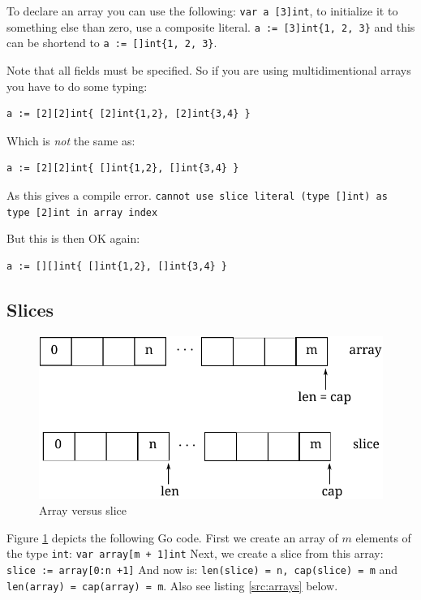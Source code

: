 To declare an array you can use the following: \lstinline{var a [3]int},
to initialize it to something else than zero, use a composite literal.
\lstinline|a := [3]int{1, 2, 3}| and
this can be shortend to \lstinline|a := []int{1, 2, 3}|.

Note that all fields must be specified.  So if you are using multidimentional
arrays you have to do some typing:
\begin{lstlisting}
a := [2][2]int{ [2]int{1,2}, [2]int{3,4} }
\end{lstlisting}
Which is \emph{not} the same as:
\begin{lstlisting}
a := [2][2]int{ []int{1,2}, []int{3,4} }
\end{lstlisting}
As this gives a compile error.\newline
\lstinline{cannot use slice literal (type []int) as type [2]int in array index}

But this is then OK again:
\begin{lstlisting}
a := [][]int{ []int{1,2}, []int{3,4} }
\end{lstlisting}

\subsection{Slices}

\begin{figure}[!bh]
\caption{Array versus slice}
\label{fig:array-vs-slice}
\begin{center}
\includegraphics[scale=0.65]{fig/array-vs-slice.pdf}
\end{center}
\end{figure}
Figure \ref{fig:array-vs-slice} depicts the following Go code.
First we create an array of $m$ elements of the type \lstinline{int}:
\lstinline{var array[m + 1]int}\newline
Next, we create a slice from this array: 
\lstinline{slice := array[0:n +1]}\newline
And now is: \lstinline{len(slice) = n, cap(slice) = m} and
\lstinline{len(array) = cap(array) = m}.\newline
Also see listing \ref{src:arrays} below.

